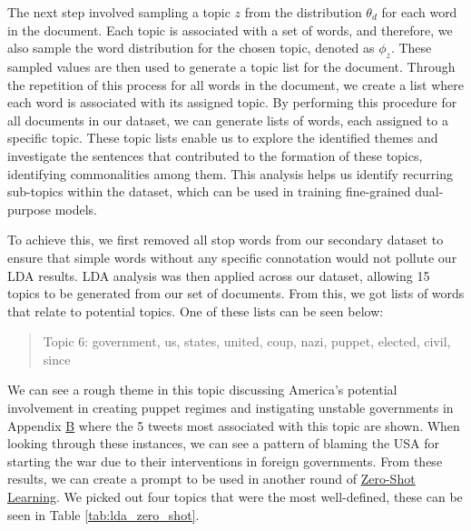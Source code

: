 The next step involved sampling a topic $z$ from the distribution $\theta_{d}$ for each word in the document. Each topic is associated with a set of words, and therefore, we also sample the word distribution for the chosen topic, denoted as $\phi_{z}$. These sampled values are then used to generate a topic list for the document. Through the repetition of this process for all words in the document, we create a list where each word is associated with its assigned topic. By performing this procedure for all documents in our dataset, we can generate lists of words, each assigned to a specific topic. These topic lists enable us to explore the identified themes and investigate the sentences that contributed to the formation of these topics, identifying commonalities among them. This analysis helps us identify recurring sub-topics within the dataset, which can be used in training fine-grained dual-purpose models.

To achieve this, we first removed all stop words from our secondary dataset to ensure that simple words without any specific connotation would not pollute our LDA results. LDA analysis was then applied across our dataset, allowing 15 topics to be generated from our set of documents. From this, we got lists of words that relate to potential topics. One of these lists can be seen below:

\begin{quote}
    Topic 6: government, us, states, united, coup, nazi, puppet, elected, civil, since
    \label{quote:topic_6}
\end{quote}

We can see a rough theme in this topic discussing America's potential involvement in creating puppet regimes and instigating unstable governments in Appendix \hyperref[app:lda_results]{B} where the 5 tweets most associated with this topic are shown. When looking through these instances, we can see a pattern of blaming the USA for starting the war due to their interventions in foreign governments. From these results, we can create a prompt to be used in another round of \hyperref[zero_shot]{Zero-Shot Learning}. We picked out four topics that were the most well-defined, these can be seen in Table \ref{tab:lda_zero_shot}.

